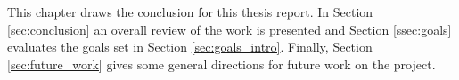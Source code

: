 This chapter draws the conclusion for this thesis report. In Section
\ref{sec:conclusion} an overall review of the work is presented and
Section \ref{ssec:goals} evaluates the goals set in Section
\ref{sec:goals_intro}. Finally, Section \ref{sec:future_work} gives
some general directions for future work on the project.